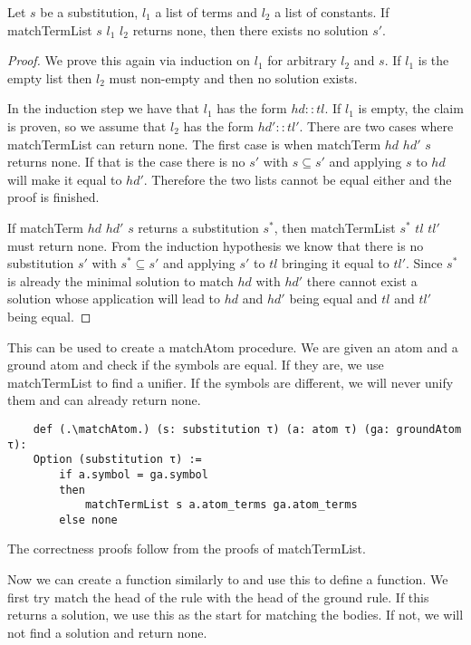 \begin{lemma}[\matchTermListNoneImplNoSolution]
    Let $s$ be a substitution, $l_1$ a list of terms and $l_2$ a list of constants. If matchTermList $s$ $l_1$ $l_2$ returns none, then there exists no solution $s'$.
\end{lemma}
\begin{proof}
    We prove this again via induction on $l_1$ for arbitrary $l_2$ and $s$. If $l_1$ is the empty list then $l_2$ must non-empty and then no solution exists.

    In the induction step we have that $l_1$ has the form $hd::tl$. If $l_1$ is empty, the claim is proven, so we assume that $l_2$ has the form $hd'::tl'$. There are two cases where matchTermList can return none. The first case is when matchTerm $hd$ $hd'$ $s$ returns none. If that is the case there is no $s'$ with $s\subseteq s'$ and applying $s$ to $hd$ will make it equal to $hd'$. Therefore the two lists cannot be equal either and the proof is finished.

    If matchTerm $hd$ $hd'$ $s$ returns a substitution $s^\ast$, then matchTermList $s^\ast$ $tl$ $tl'$ must return none. From the induction hypothesis we know that there is no substitution $s'$ with $s^\ast \subseteq s'$ and applying $s'$ to $tl$ bringing it equal to $tl'$. Since $s^\ast$ is already the minimal solution to match $hd$ with $hd'$ there cannot exist a solution whose application will lead to $hd$ and $hd'$ being equal and $tl$ and $tl'$ being equal.
\end{proof}

This can be used to create a matchAtom procedure. We are given an atom and a ground atom and check if the symbols are equal. If they are, we use matchTermList to find a unifier.
If the symbols are different, we will never unify them and can already return none.

\begin{lstlisting}
    def (.\matchAtom.) (s: substitution τ) (a: atom τ) (ga: groundAtom τ):
    Option (substitution τ) :=
        if a.symbol = ga.symbol
        then
            matchTermList s a.atom_terms ga.atom_terms
        else none
\end{lstlisting}

The correctness proofs follow from the proofs of matchTermList.

Now we can create a \matchAtomList function similarly to \matchTermList and use this to define a \matchRule function. We first try match the head of the rule with the head of the ground rule. If this returns a solution, we use this as the start for matching the bodies. If not, we will not find a solution and return none.

